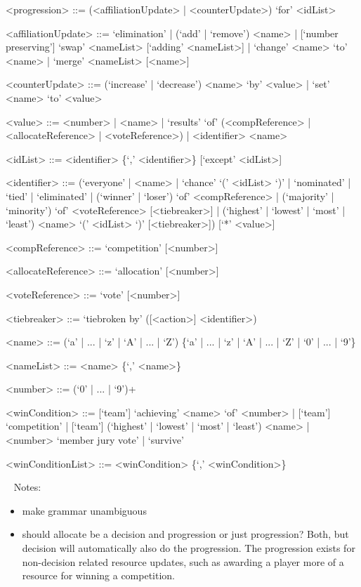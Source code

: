 \documentclass{article}
\begin{document}
\begin{grammar}
<progression> ::= (<affiliationUpdate> | <counterUpdate>) `for' <idList>

<affiliationUpdate> ::= `elimination' | (`add' | `remove') <name> | 
[`number preserving'] `swap' <nameList> [`adding' <nameList>] | `change' <name> 
`to' <name> | `merge' <nameList> [<name>]

<counterUpdate> ::= (`increase' | `decrease') <name> `by' <value> | `set' 
<name> `to' <value> 

<value> ::= <number> | <name> | `results' `of' (<compReference> | 
<allocateReference> |
<voteReference>) | <identifier> <name> %

<idList> ::= <identifier> \{`,' <identifier>\} [`except' <idList>]

<identifier> ::= (`everyone' | <name> | `chance' `(' <idList> `)' | `nominated' 
| 
`tied' | 
`eliminated' | (`winner' | `loser') `of' <compReference> | (`majority' | 
`minority') `of' <voteReference>  [<tiebreaker>] | (`highest' | `lowest' | 
`most' | `least') <name> `(' <idList> `)' [<tiebreaker>])
[`*' <value>]

<compReference> ::= `competition' [<number>] 

<allocateReference> ::= `allocation' [<number>]

<voteReference> ::= `vote' [<number>]

<tiebreaker> ::= `tiebroken by' ([<action>] <identifier>)

<name> ::= (`a' | ... | `z' | `A' | ... | `Z') \{`a' | ... | `z' | `A' | ... | 
`Z' | `0' | ... | `9'\}

<nameList> ::= <name> \{`,' <name>\}

<number> ::= (`0' | ... | `9')+

<winCondition> ::= [`team'] `achieving' <name> `of' <number> | [`team'] 
`competition' | [`team'] (`highest' | `lowest' | `most' | `least') <name> | 
<number> `member jury vote' | `survive'

<winConditionList> ::= <winCondition> \{`,' <winCondition>\}

\end{grammar}

~\newline
Notes:
\begin{itemize}
	\item make grammar unambiguous
	\item should allocate be a decision and progression or just progression? 
	Both, but decision will automatically also do the progression. The 
	progression exists for non-decision related resource updates, such as 
	awarding a player more of a resource for winning a competition.
\end{itemize}
\end{document}
